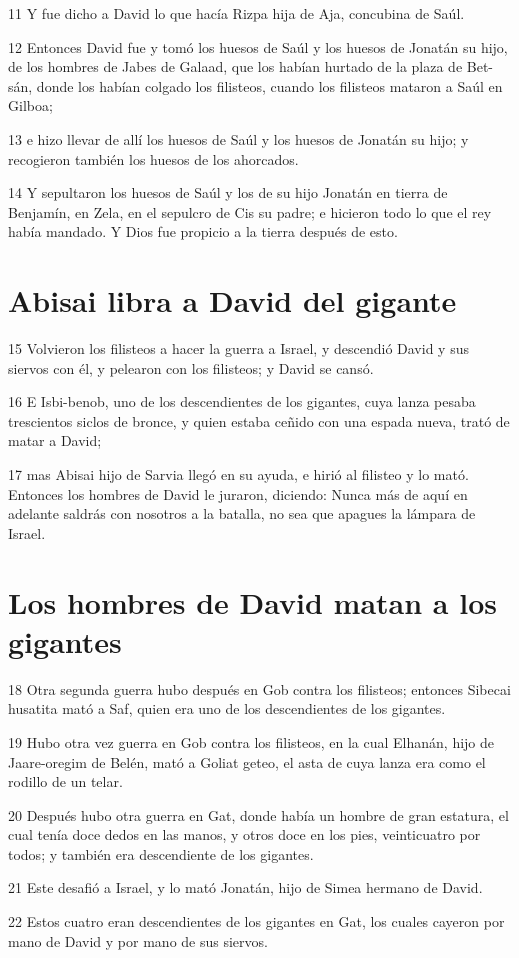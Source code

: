 \par 11 Y fue dicho a David lo que hacía Rizpa hija de Aja, concubina de Saúl.
\par 12 Entonces David fue y tomó los huesos de Saúl y los huesos de Jonatán su hijo, de los hombres de Jabes de Galaad, que los habían hurtado de la plaza de Bet-sán, donde los habían colgado los filisteos, cuando los filisteos mataron a Saúl en Gilboa; 
\par 13 e hizo llevar de allí los huesos de Saúl y los huesos de Jonatán su hijo; y recogieron también los huesos de los ahorcados.
\par 14 Y sepultaron los huesos de Saúl y los de su hijo Jonatán en tierra de Benjamín, en Zela, en el sepulcro de Cis su padre; e hicieron todo lo que el rey había mandado. Y Dios fue propicio a la tierra después de esto.

\section*{Abisai libra a David del gigante}

\par 15 Volvieron los filisteos a hacer la guerra a Israel, y descendió David y sus siervos con él, y pelearon con los filisteos; y David se cansó.
\par 16 E Isbi-benob, uno de los descendientes de los gigantes, cuya lanza pesaba trescientos siclos de bronce,  y quien estaba ceñido con una espada nueva, trató de matar a David;
\par 17 mas Abisai hijo de Sarvia llegó en su ayuda, e hirió al filisteo y lo mató. Entonces los hombres de David le juraron, diciendo: Nunca más de aquí en adelante saldrás con nosotros a la batalla, no sea que apagues la lámpara de Israel.

\section*{Los hombres de David matan a los gigantes}

\par 18 Otra segunda guerra hubo después en Gob contra los filisteos; entonces Sibecai husatita mató a Saf, quien era uno de los descendientes de los gigantes.
\par 19 Hubo otra vez guerra en Gob contra los filisteos, en la cual Elhanán, hijo de Jaare-oregim de Belén, mató a Goliat geteo, el asta de cuya lanza era como el rodillo de un telar.
\par 20 Después hubo otra guerra en Gat, donde había un hombre de gran estatura, el cual tenía doce dedos en las manos, y otros doce en los pies, veinticuatro por todos; y también era descendiente de los gigantes.
\par 21 Este desafió a Israel, y lo mató Jonatán, hijo de Simea hermano de David.
\par 22 Estos cuatro eran descendientes de los gigantes en Gat, los cuales cayeron por mano de David y por mano de sus siervos.


